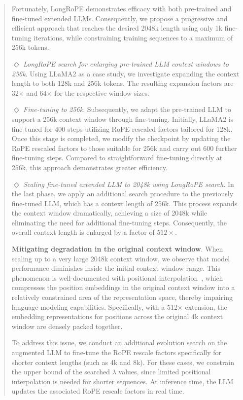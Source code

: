 \begin{abstract}
Fortunately, LongRoPE demonstrates efficacy with both pre-trained and fine-tuned extended LLMs. Consequently, we propose a progressive and efficient approach that reaches the desired 2048k length using only 1k fine-tuning iterations, while constraining training sequences to a maximum of 256k tokens.

$\Diamond$ \textit{LongRoPE search for enlarging pre-trained LLM context windows to 256k}. Using LLaMA2 as a case study, we investigate expanding the context length to both 128k and 256k tokens. The resulting expansion factors are 32$\times$ and 64$\times$ for the respective window sizes.

$\Diamond$ \textit{Fine-tuning to 256k}. Subsequently, we adapt the pre-trained LLM to support a 256k context window through fine-tuning. Initially, LLaMA2 is fine-tuned for 400 steps utilizing RoPE rescaled factors tailored for 128k. Once this stage is completed, we modify the checkpoint by updating the RoPE rescaled factors to those suitable for 256k and carry out 600 further fine-tuning steps. Compared to straightforward fine-tuning directly at 256k, this approach demonstrates greater efficiency.

$\Diamond$ \textit{Scaling fine-tuned extended LLM to 2048k using LongRoPE search}. In the last phase, we apply an additional search procedure to the previously fine-tuned LLM, which has a context length of 256k. This process expands the context window dramatically, achieving a size of 2048k while eliminating the need for additional fine-tuning steps. Consequently, the overall context length is enlarged by a factor of $512\times$.

\textbf{Mitigating degradation in the original context window}. When scaling up to a very large 2048k context window, we observe that model performance diminishes inside the initial context window range. This phenomenon is well-documented with positional interpolation~\cite{pi}, which compresses the position embeddings in the original context window into a relatively constrained area of the representation space, thereby impairing language modeling capabilities. Specifically, with a 512$\times$ extension, the embedding representations for positions across the original 4k context window are densely packed together.

To address this issue, we conduct an additional evolution search on the augmented LLM to fine-tune the RoPE rescale factors specifically for shorter context lengths (such as 4k and 8k). For these cases, we constrain the upper bound of the searched $\lambda$ values, since limited positional interpolation is needed for shorter sequences. At inference time, the LLM updates the associated RoPE rescale factors in real time.


\end{abstract}
